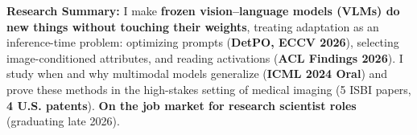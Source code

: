 \documentclass[10pt,a4paper,ragged2e,withhyper]{altacv}
\renewcommand{\cvsection}[2][]{\needspace{6\baselineskip}\origcvsection[#1]{#2}}
\begin{document}
\makecvheader

\vspace{0.2em}
\begin{tcolorbox}[colback=blue!5!white, colframe=accent, boxrule=0.4pt, arc=2mm, left=1mm, right=1mm, top=1mm, bottom=1mm]
\textbf{Research Summary:} 
I make \textbf{frozen vision--language models (VLMs) do new things without touching their weights},
treating adaptation as an inference-time problem: optimizing prompts (\textbf{DetPO, ECCV 2026}),
selecting image-conditioned attributes, and reading activations (\textbf{ACL Findings 2026}).
I study when and why multimodal models generalize (\textbf{ICML 2024 Oral}) and prove these methods
in the high-stakes setting of medical imaging (5 ISBI papers, \textbf{4 U.S. patents}).
\textbf{On the job market for research scientist roles} (graduating late 2026).
\end{tcolorbox}
\vspace{0.2em}

\end{document}
